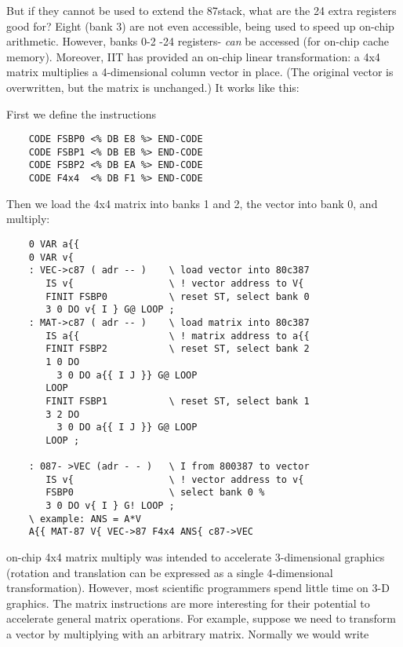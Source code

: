 But if they cannot be used to extend the 87stack, what are the 24 extra registers good for? Eight (bank 3) are not even accessible, being used to speed up on-chip arithmetic. However, banks 0-2 -24 registers- \textit{can} be accessed (\eg for on-chip cache memory). Moreover, IIT has provided an on-chip linear transformation: a 4x4 matrix multiplies a 4-dimensional column vector in place. (The original vector is overwritten, but the matrix is unchanged.) It works like this:

First we define the instructions

\begin{lstlisting}
    CODE FSBP0 <% DB E8 %> END-CODE
    CODE FSBP1 <% DB EB %> END-CODE
    CODE FSBP2 <% DB EA %> END-CODE
    CODE F4x4  <% DB F1 %> END-CODE
\end{lstlisting}

Then we load the 4x4 matrix into banks 1 and 2, the vector into bank 0, and multiply:

\begin{lstlisting}
    0 VAR a{{
    0 VAR v{
    : VEC->c87 ( adr -- )    \ load vector into 80c387
       IS v{                 \ ! vector address to V{
       FINIT FSBP0           \ reset ST, select bank 0
       3 0 DO v{ I } G@ LOOP ;
    : MAT->c87 ( adr -- )    \ load matrix into 80c387
       IS a{{                \ ! matrix address to a{{
       FINIT FSBP2           \ reset ST, select bank 2
       1 0 DO
         3 0 DO a{{ I J }} G@ LOOP
       LOOP
       FINIT FSBP1           \ reset ST, select bank 1
       3 2 DO
         3 0 DO a{{ I J }} G@ LOOP
       LOOP ;
       
    : 087- >VEC (adr - - )   \ I from 800387 to vector
       IS v{                 \ ! vector address to v{
       FSBP0                 \ select bank 0 %
       3 0 DO v{ I } G! LOOP ;
    \ example: ANS = A*V
    A{{ MAT-87 V{ VEC->87 F4x4 ANS{ c87->VEC
\end{lstlisting}
 

 on-chip 4x4 matrix multiply was intended to accelerate 3-dimensional graphics (rotation and translation can be expressed as a single 4-dimensional transformation). However, most scientific programmers spend little time on 3-D graphics. The matrix instructions are more interesting for their potential to accelerate general matrix operations. For example, suppose we need to transform a vector by multiplying with an arbitrary matrix. Normally we would write


